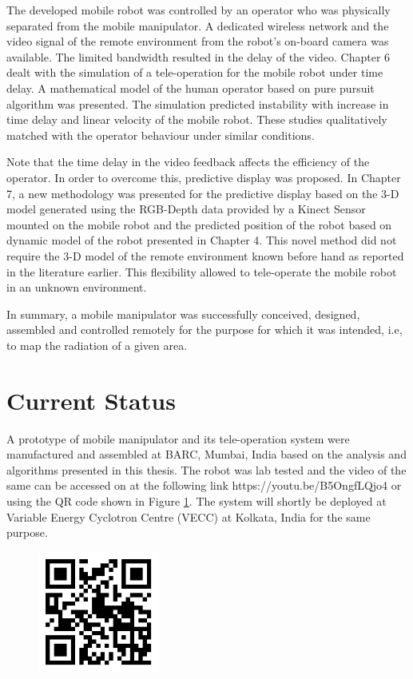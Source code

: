 The developed mobile robot was controlled by an operator who was  physically separated from the mobile manipulator. A dedicated wireless network and the video signal of the remote environment from the robot's on-board camera was available. The limited bandwidth resulted in the delay of the video. 
Chapter 6 dealt with the simulation of a tele-operation for the mobile robot under time delay.
 A mathematical model of the human operator based on pure pursuit algorithm was presented. 
 The simulation  predicted instability with increase in time delay and linear velocity of the mobile robot.
  These studies qualitatively matched with the operator behaviour under similar conditions.

   Note that the time delay in the video feedback affects the efficiency of the operator. 
   In order to overcome this, predictive display was proposed.
   In Chapter 7,  a new methodology was presented for the predictive display based on the 3-D model generated using the RGB-Depth data provided by a Kinect Sensor mounted on the mobile robot and the predicted position of the robot based on dynamic model of the robot presented in Chapter 4.
   This novel method did not require  the 3-D model of the remote environment known before hand as reported in the literature earlier.
   This flexibility allowed to tele-operate  the mobile robot in an unknown environment. 
   
   In summary, a mobile manipulator was successfully conceived, designed, assembled and controlled remotely  for the purpose for which it was intended, i.e, to map the radiation of a given area.
   
   \section{Current Status} 
   A prototype of  mobile manipulator and its tele-operation system were   manufactured and assembled at BARC, Mumbai, India based on the analysis and algorithms presented in this thesis. The robot was lab tested and the video of the same can be accessed on at the following link https://youtu.be/B5OngfLQjo4 or using the QR code shown in Figure \ref{fig:QR}. The system will  shortly  be deployed at Variable Energy Cyclotron Centre (VECC) at Kolkata, India for the same purpose. 
\begin{figure}[h]
	\centering
	\includegraphics[height=4cm]{Chapter8/figure/qrcode}
	\label{fig:QR}
\end{figure}

